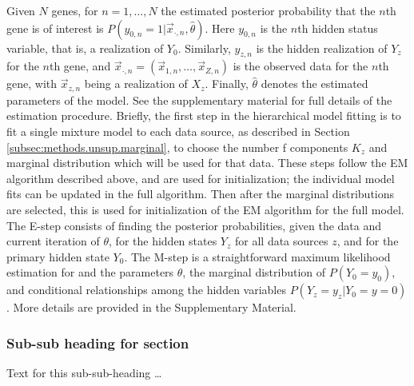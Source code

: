 \documentclass{bmcart}
\begin{document}
Given $N$ genes, for $n = 1, \ldots, N$ the estimated posterior probability that the $n$th gene is of interest is $P(y_{0,n} = 1 
| \vec x_{\cdot,n}, \hat\theta)$.  Here $y_{0,n}$ is the $n$th hidden status variable, that is, a realization of $Y_0$.  
Similarly, $y_{z,n}$ is the hidden realization of $Y_z$ for the $n$th gene, and $\vec x_{\cdot,n} = (\vec x_{1,n}, \ldots, \vec 
x_{Z,n})$ is the observed data for the $n$th gene, with $\vec x_{z,n}$ being a realization of $X_z$.  Finally, $\hat\theta$ denotes 
the estimated parameters of the model.   See the supplementary material for full details of the estimation procedure. 
Briefly,  the first step in the hierarchical model fitting is to fit a single mixture model to each data source, as described in Section \ref{subsec:methods.unsup.marginal}, to choose the number  f components $K_z$ and marginal distribution which will be used for that data. These steps follow the EM algorithm described above, and are used for initialization; the individual model fits can be updated in the full algorithm. Then after the marginal distributions are selected, this is used for initialization of the EM algorithm for the full model. The E-step consists of finding the posterior probabilities, given the data and current iteration of $\theta$, for the hidden states $Y_z$ for all data sources $z$, and for the primary hidden state $Y_0$.  The M-step is a straightforward maximum likelihood estimation for and the parameters $\theta$, the marginal distribution of $P(Y_0=y_0)$, and conditional relationships among the hidden variables $P(Y_z = y_z| Y_0 = y=0)$. More details are provided in the Supplementary Material.





 
 
\subsubsection*{Sub-sub heading for section}
Text for this sub-sub-heading \ldots
\end{document}
